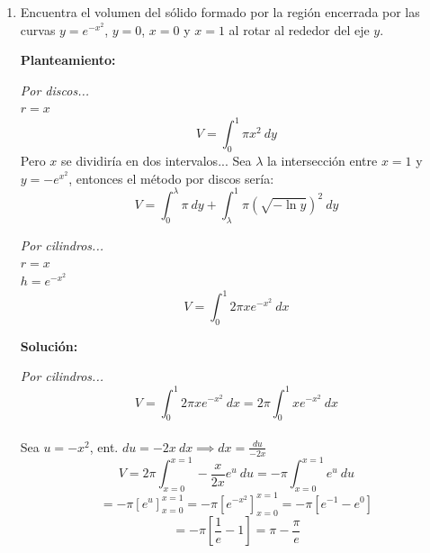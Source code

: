 \documentclass[10pt,letterpaper]{article}
\begin{document}
\begin{enumerate}

\item Encuentra el volumen del sólido formado por la región encerrada por las curvas $y=e^{-x^2}$,
      $y=0$, $x=0$ y $x=1$ al rotar al rededor del eje $y$.

\begin{multicols}{2}


\textbf{Planteamiento:}

\textit{Por discos...} \\
$r = x$
$$V = \int_{0}^{1} \pi x^2\ dy$$
Pero $x$ se dividiría en dos intervalos... Sea $\lambda$ la intersección entre $x=1$ y $y=-e^{x^2}$,
entonces el método por discos sería:
$$V = \int_{0}^{\lambda} \pi\ dy + \int_{\lambda}^{1} \pi( \sqrt{-\ln{y}} )^2\ dy $$

\textit{Por cilindros...} \\
$r = x$ \\
$h = e^{-x^2}$
$$V = \int_{0}^{1} 2 \pi x e^{-x^2}\ dx$$

\textbf{Solución:}

\textit{Por cilindros...}
$$V = \int_{0}^{1} 2 \pi x e^{-x^2}\ dx = 2\pi \int_{0}^{1} x e^{-x^2}\ dx$$ \\
Sea $u = -x^2$, ent. $du = -2x\ dx \implies dx = \frac{du}{-2x}$
$$V = 2\pi \int_{x=0}^{x=1} -\frac{x}{2x} e^u\ du = -\pi \int_{x=0}^{x=1} e^u\ du$$
$$= -\pi[e^u]_{x=0}^{x=1} = -\pi[e^{-x^2}]_{x=0}^{x=1} = -\pi[e^{-1}-e^0]$$
$$= -\pi[\frac{1}{e}-1] = \pi - \frac{\pi}{e}$$


\end{multicols}
\end{enumerate}
\end{document}
